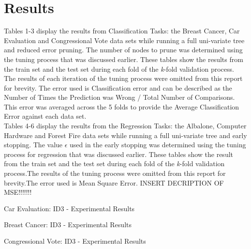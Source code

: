 \documentclass[twoside,11pt]{article}
\begin{document}
\newpage

\section{Results}
Tables 1-3 display the results from Classification Tasks: the Breast Cancer, Car Evaluation and Congressional Vote data sets while running a full uni-variate tree and reduced error pruning. The number of nodes to prune was determined using the tuning process that was discussed earlier. These tables show the results from the train set and the test set during each fold of the \textit{k}-fold validation process. The results of each iteration of the tuning process were omitted from this report for brevity. The error used is Classification error and can be described as the Number of Times the Prediction was Wrong / Total Number of Comparisons. This error was averaged across the 5 folds to provide the Average Classification Error against each data set.\\
Tables 4-6 display the results from the Regression Tasks: the Albalone, Computer Hardware and Forest Fire data sets while running a full uni-variate tree and early stopping. The value $\epsilon$ used in the early stopping was determined using the tuning process for regression that was discussed earlier. These tables show the result from the train set and the test set during each fold of the \textit{k}-fold validation process.The results of the tuning process were omitted from this report for brevity.The error used is  Mean Square Error. INSERT DECRIPTION OF MSE!!!!!!!\newline

\begin{table}[h]
		\centering
		\caption{Car Evaluation: ID3 - Experimental Results}
		\label{tab:table1}
\end{table}

\begin{table}[h]
		\centering
		\caption{Breast Cancer: ID3 - Experimental Results}
		\label{tab:table2}
\end{table}

\begin{table}[h]
		\centering
		\caption{Congressional Vote: ID3 - Experimental Results}
		\label{tab:table3}
\end{table}
\end{document}
